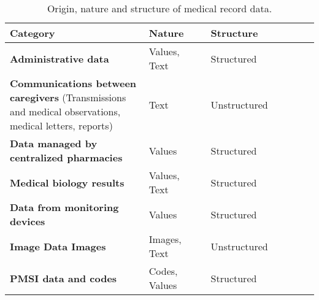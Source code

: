 \begin{table}[h!]
    \centering
    \begin{tabular}{|m{0.45\linewidth}|m{0.20\linewidth}|m{0.35\linewidth}|}
        \hline
        Category                                         & Nature                                                        & Structure                                                   \\
        \hline
        \textbf{Administrative data}                                           & Values, Text                                 & Structured                                       \\
        \hline
        \textbf{Communications between caregivers} (Transmissions and medical observations, medical letters, reports)                      & Text              & Unstructured                                               \\
        \hline
        \textbf{Data managed by centralized pharmacies}                       & Values         & Structured                    \\
        \hline
        \textbf{Medical biology results}                               & Values, Text & Structured                           \\
        \hline
        \textbf{Data from monitoring devices}     & Values                                                         & Structured                                                      \\
        \hline
        \textbf{Image Data Images}                             & Images, Text                                                & Unstructured                               \\
        \hline
        \textbf{PMSI data and codes}  & Codes, Values                                                        & Structured                                              \\
                               
        \hline
    \end{tabular} 

    \caption{Origin, nature and structure of medical record data.}
    \label{tab:sourceTable}
\end{table}
